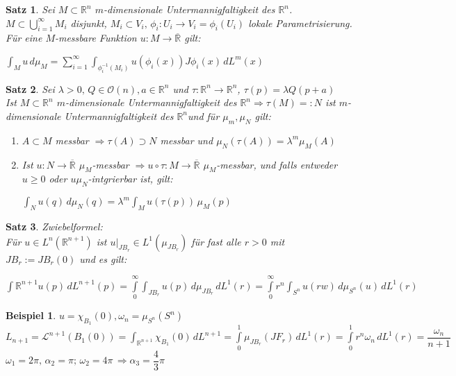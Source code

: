 \documentclass[11pt]{memoir}
\theoremstyle{changebreak}
\newtheorem{Beispiel}{Beispiel}[chapter]
\newtheorem{Satz}{Satz}[chapter]
\newcommand{\umgf}{$m$-dimensionale Untermannigfaltigkeit des $\mathbb R^n$}
\begin{document}
\begin{Satz}
Sei $M \subset \mathbb R^n$ \umgf. $M \subset \bigcup\limits_{i=1}^\infty M_i$ disjunkt, $M_i \subset V_i, \, \phi_i: U_i \rightarrow V_i = \phi_i(U_i)$ lokale Parametrisierung. Für eine $M$-messbare Funktion $u: M \rightarrow \overline{\mathbb R}$ gilt:
\begin{center}
	$\int_M u \, d\mu_M = \sum\limits_{i=1}^\infty \int_{\phi_i^{-1}(M_i)} u(\phi_i(x))J\phi_i(x) \, dL^m(x)$
\end{center}
\end{Satz}

\begin{Satz}
Sei $\lambda > 0, \, Q \in \mathscr O(n), a \in \mathbb R^n$ und $\tau: \mathbb R^n \rightarrow \mathbb R^n$, $\tau(p) = \lambda Q(p+a)$ \\
Ist $M \subset \mathbb R^n$ \umgf $\Rightarrow \tau(M) =: N$ ist \umgf und für $\mu_m, \mu_N$ gilt:
\begin{enumerate}
	\item $A \subset M$ messbar $\Rightarrow \tau(A) \supset N$ messbar und $\mu_N (\tau(A)) = \lambda^m \mu_M (A)$
	\item Ist $u: N \rightarrow \overline{\mathbb R}$ $\mu_M$-messbar $\Rightarrow u \circ \tau: M \rightarrow \overline{\mathbb R}$ $\mu_M$-messbar, und falls entweder $u \geq 0$ oder $u \mu_N$-intgrierbar ist, gilt:
	\begin{center}
		$\int_N u(q) \,d\mu_N(q) = \lambda^m \int_M u(\tau(p))\, \mu_M(p)$
	\end{center}
\end{enumerate}
\end{Satz}

\begin{Satz}
\emph{Zwiebelformel}: \\
Für $u \in L^n(\mathbb R^{n+1})$ ist $u|_{JB_r} \in L^1(\mu_{JB_r})$ für fast alle $r >0$ mit $JB_r:= JB_r(0)$ und es gilt:
\begin{center}
	$\int{\mathbb R^{n+1}} u(p) \, dL^{n+1}(p) = \int\limits_0^\infty \int_{JB_r} u(p) \,d\mu_{JB_r} \,dL^1(r) = \int\limits_0^\infty r^n \int_{S^n} u(rw)\,d\mu_{S^n}(u) \,dL^1(r)$
\end{center}
\end{Satz}

\begin{Beispiel}
$u = \chi_{B_1}(0), \omega_n = \mu_{S^n} (S^n) $\\
$L_{n+1} = \mathscr L^{n+1}(B_1(0)) = \int_{\mathbb R^{n+1}} \chi_{B_1}(0) \,dL^{n+1} = \int\limits_0^1 \mu_{JB_r}(JF_r) \,dL^1(r) = \int\limits_0^1 r^n \omega_n \, dL^1(r)   = \dfrac{\omega_n}{n+1}$ \\
$\omega_1 = 2\pi, \, \alpha_2 = \pi; \, \omega_2 = 4\pi \, \Rightarrow \alpha_3 = \dfrac{4}{3}\pi$
\end{Beispiel}
\end{document}
